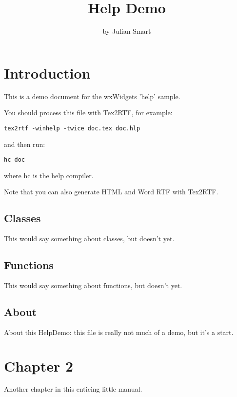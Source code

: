 %
\parskip=10pt%
\parindent=0pt%
\title{Help Demo}%
\author{by Julian Smart}%
\makeindex%
%
\maketitle%
\pagestyle{fancyplain}%
%
%
%
\setfooter{\thepage}{}{}{}{}{\thepage}%
\tableofcontents%

\chapter{Introduction}\label{intro}
%
%
\setfooter{\thepage}{}{}{}{}{\thepage}%

This is a demo document for the wxWidgets 'help' sample.

You should process this file with Tex2RTF, for example:

{\tt tex2rtf -winhelp -twice doc.tex doc.hlp}

and then run:

{\tt hc doc}

where hc is the help compiler.

Note that you can also generate HTML and Word RTF with Tex2RTF.

\section{Classes}\label{classes}

This would say something about classes, but doesn't yet.

\section{Functions}\label{functions}

This would say something about functions, but doesn't yet.

\section{About}\label{about}

About this HelpDemo: this file is really not much of a demo, but it's a start.

\chapter{Chapter 2}\label{chapter2}
%
%
\setfooter{\thepage}{}{}{}{}{\thepage}%

Another chapter in this enticing little manual.

%
\setfooter{\thepage}{}{}{}{}{\thepage}%
\printindex%


